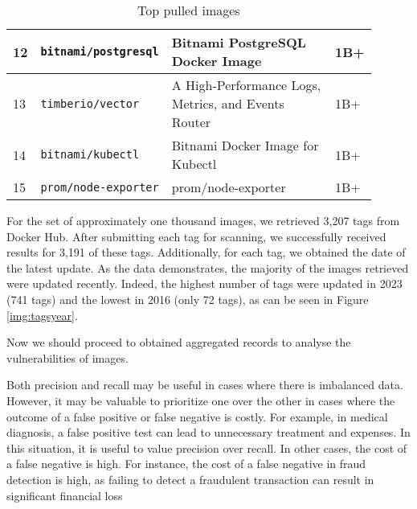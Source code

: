 \begin{table}[h]
\begin{tabular}{| p{0.02\linewidth} | p{0.3\linewidth} | p{0.5\linewidth} | p{0.08\linewidth} |}
        12 & \texttt{bitnami/postgresql}    & Bitnami PostgreSQL Docker Image                                                                 & 1B+   \\ \hline
        13 & \texttt{timberio/vector}       & A High-Performance Logs, Metrics, and Events Router                                             & 1B+   \\ \hline
        14 & \texttt{bitnami/kubectl}       & Bitnami Docker Image for Kubectl                                                                & 1B+   \\ \hline
        15 & \texttt{prom/node-exporter}    & prom/node-exporter                                                                              & 1B+   \\ \hline
    \end{tabular}
    \caption{Top pulled images}
    \label{tab:topimages}
\end{table}



For the set of approximately one thousand images, we retrieved 3,207 tags from Docker Hub. After submitting each tag for scanning, we successfully received results for 3,191 of these tags. Additionally, for each tag, we obtained the date of the latest update. As the data demonstrates, the majority of the images retrieved were updated recently. Indeed, the highest number of tags were updated in 2023 (741 tags) and the lowest in 2016 (only 72 tags), as can be seen in Figure \ref{img:tagsyear}.


Now we should proceed to obtained aggregated records to analyse the vulnerabilities of images. 






Both precision and recall may be useful in cases where there is imbalanced data. However, it may be valuable to prioritize one over the other in cases where the outcome of a false positive or false negative is costly. For example, in medical diagnosis, a false positive test can lead to unnecessary treatment and expenses. In this situation, it is useful to value precision over recall. In other cases, the cost of a false negative is high. For instance, the cost of a false negative in fraud detection is high, as failing to detect a fraudulent transaction can result in significant financial loss

